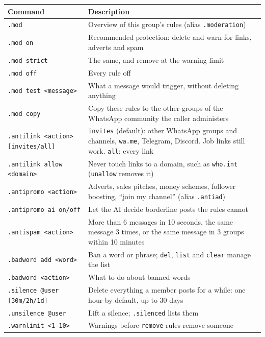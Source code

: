 \documentclass[11pt,a4paper]{report}
\begin{document}
\begin{center}
\begin{tabularx}{\textwidth}{@{}lX@{}}
\toprule
\textbf{Command} & \textbf{Description} \\
\midrule
\texttt{.mod} & Overview of this group's rules (alias \texttt{.moderation}) \\
\texttt{.mod on} & Recommended protection: delete and warn for links,
adverts and spam \\
\texttt{.mod strict} & The same, and remove at the warning limit \\
\texttt{.mod off} & Every rule off \\
\texttt{.mod test <message>} & What a message would trigger, without deleting
anything \\
\texttt{.mod copy} & Copy these rules to the other groups of the WhatsApp
community the caller administers \\
\texttt{.antilink <action> [invites/all]} & \texttt{invites} (default): other
WhatsApp groups and channels, \texttt{wa.me}, Telegram, Discord. Job links
still work. \texttt{all}: every link \\
\texttt{.antilink allow <domain>} & Never touch links to a domain, such as
\texttt{who.int} (\texttt{unallow} removes it) \\
\texttt{.antipromo <action>} & Adverts, sales pitches, money schemes,
follower boosting, ``join my channel'' (alias \texttt{.antiad}) \\
\texttt{.antipromo ai on/off} & Let the AI decide borderline posts the rules
cannot \\
\texttt{.antispam <action>} & More than 6 messages in 10 seconds, the same
message 3 times, or the same message in 3 groups within 10 minutes \\
\texttt{.badword add <word>} & Ban a word or phrase; \texttt{del},
\texttt{list} and \texttt{clear} manage the list \\
\texttt{.badword <action>} & What to do about banned words \\
\texttt{.silence @user [30m/2h/1d]} & Delete everything a member posts for a
while: one hour by default, up to 30 days \\
\texttt{.unsilence @user} & Lift a silence; \texttt{.silenced} lists them \\
\texttt{.warnlimit <1-10>} & Warnings before \texttt{remove} rules remove
someone \\
\bottomrule
\end{tabularx}
\end{center}
\end{document}
